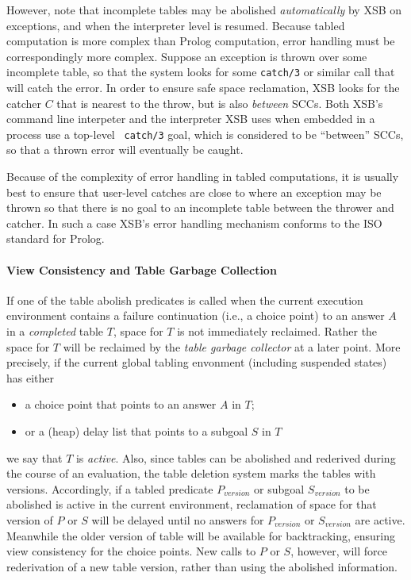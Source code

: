 \begin{description}
However, note that incomplete tables may be abolished
\emph{automatically} by XSB on exceptions, and when the interpreter
level is resumed.  Because tabled computation is more complex than
Prolog computation, error handling must be correspondingly more
complex.  Suppose an exception is thrown over some incomplete table,
so that the system looks for some {\tt catch/3} or similar call that
will catch the error.  In order to ensure safe space reclamation, XSB
looks for the catcher $C$ that is nearest to the throw, but is also
{\em between} SCCs.  Both XSB's command line interpeter and the
interpreter XSB uses when embedded in a process use a top-level {\tt
  catch/3} goal, which is considered to be ``between'' SCCs, so that a
thrown error will eventually be caught.

Because of the complexity of error handling in tabled computations, it
is usually best to ensure that user-level catches are close to where
an exception may be thrown so that there is no goal to an incomplete
table between the thrower and catcher. In such a case XSB's error
handling mechanism conforms to the ISO standard for Prolog.

\paragraph{View Consistency and Table Garbage Collection}
If one of the table abolish predicates is called when the current
execution environment contains a failure continuation (i.e., a choice
point) to an answer $A$ in a {\em completed} table $T$, space for $T$
is not immediately reclaimed.  Rather the space for $T$ will be
reclaimed by the {\em table garbage collector} at a later point.  More
precisely, if the current global tabling envonment (including
suspended states) has either
\begin{itemize}
\item a choice point that points to an answer $A$ in $T$; 
\item or a (heap) delay list that points to a subgoal $S$ in $T$
\end{itemize}
we say that $T$ is {\em active}.  Also, since tables can be abolished
and rederived during the course of an evaluation, the table deletion
system marks the tables with versions.  Accordingly, if a tabled
predicate $P_{version}$ or subgoal $S_{version}$ to be abolished is
active in the current environment, reclamation of space for that
version of $P$ or $S$ will be delayed until no answers for
$P_{version}$ or $S_{version}$ are active.  Meanwhile the older
version of table will be available for backtracking, ensuring view
consistency for the choice points.  New calls to $P$ or $S$, however,
will force rederivation of a new table version, rather than using the
abolished information.


\end{description}
